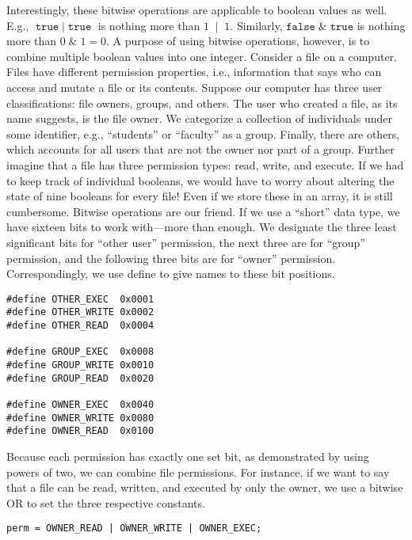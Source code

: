 Interestingly, these bitwise operations are applicable to boolean values as well. E.g., $\texttt{true}\;\mathbin{|}\;\texttt{true}$ is nothing more than $1\;\mathbin{|}\;1$. Similarly, $\texttt{false}\;\mathbin{\&}\;\texttt{true}$ is nothing more than $0\;\mathbin{\&}\;1 = 0$. A purpose of using bitwise operations, however, is to combine multiple boolean values into one integer. Consider a file on a computer. Files have different permission properties, i.e., information that says who can access and mutate a file or its contents. Suppose our computer has three user classifications: file owners, groups, and others. The user who created a file, as its name suggests, is the file owner. We categorize a collection of individuals under some identifier, e.g., ``students'' or ``faculty'' as a group. Finally, there are others, which accounts for all users that are not the owner nor part of a group. Further imagine that a file has three permission types: read, write, and execute. If we had to keep track of individual booleans, we would have to worry about altering the state of nine booleans for every file! Even if we store these in an array, it is still cumbersome. Bitwise operations are our friend. If we use a ``short'' data type, we have sixteen bits to work with—more than enough. We designate the three least significant bits for ``other user'' permission, the next three are for ``group'' permission, and the following three bits are for ``owner'' permission. Correspondingly, we use define to give names to these bit positions.

\begin{cl}[]{}\begin{lstlisting}[language=MyC]
#define OTHER_EXEC  0x0001
#define OTHER_WRITE 0x0002
#define OTHER_READ  0x0004

#define GROUP_EXEC  0x0008
#define GROUP_WRITE 0x0010
#define GROUP_READ  0x0020

#define OWNER_EXEC  0x0040
#define OWNER_WRITE 0x0080
#define OWNER_READ  0x0100
\end{lstlisting}\end{cl}

Because each permission has exactly one set bit, as demonstrated by using powers of two, we can combine file permissions. For instance, if we want to say that a file can be read, written, and executed by only the owner, we use a bitwise OR to set the three respective constants.

\begin{cl}[]{}\begin{lstlisting}[language=MyOutput]
perm = OWNER_READ | OWNER_WRITE | OWNER_EXEC;
\end{lstlisting}\end{cl}

